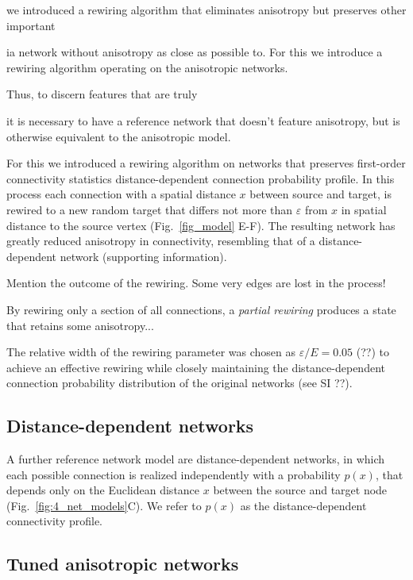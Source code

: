 we introduced a rewiring algorithm that eliminates anisotropy but preserves other important 


ia network without anisotropy as close as possible to. For this we introduce a rewiring algorithm operating
on the anisotropic networks.

Thus, to
discern features that are truly 

it is necessary to have a reference network that doesn't
feature anisotropy, but is otherwise equivalent to the anisotropic
model.

For this we introduced a rewiring algorithm on networks that
preserves first-order connectivity statistics %
distance-dependent connection probability profile. In this process
each connection with a spatial distance $x$ between source and target,
is rewired to a new random target that differs not more than
$\varepsilon$ from $x$ in spatial distance to the source vertex
(Fig.~\ref{fig_model} E-F). The resulting network has greatly reduced
anisotropy in connectivity, resembling that of a distance-dependent
network (supporting information).

Mention the outcome of the rewiring. Some very edges are lost in the process! %

By rewiring only a section of all connections, a \textit{partial
  rewiring} produces a state that retains some anisotropy...



The relative width of the rewiring parameter was chosen as $\varepsilon / E = 0.05$ (??) to achieve an effective rewiring while closely maintaining the distance-dependent connection probability distribution of the original networks (see SI ??).





\subsection*{Distance-dependent networks}

A further reference network model are distance-dependent networks, in which each possible connection is realized independently with a probability $p(x)$, that depends only on the Euclidean distance $x$ between the source and target node (Fig.~\ref{fig:4_net_models}C). We refer to $p(x)$ as the distance-dependent connectivity profile.


\subsection*{Tuned anisotropic networks}




